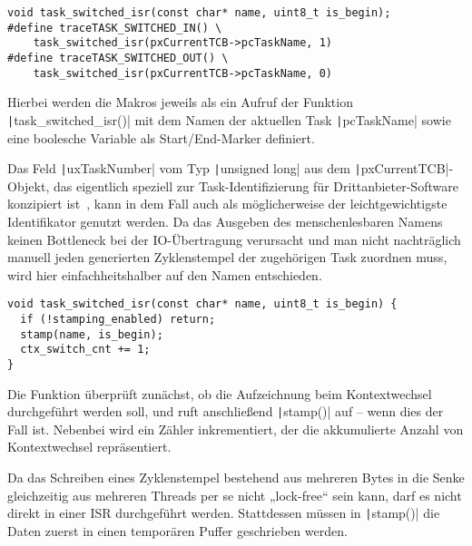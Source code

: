 \begin{code}
\begin{verbatim}
void task_switched_isr(const char* name, uint8_t is_begin);
#define traceTASK_SWITCHED_IN() \
    task_switched_isr(pxCurrentTCB->pcTaskName, 1)
#define traceTASK_SWITCHED_OUT() \
    task_switched_isr(pxCurrentTCB->pcTaskName, 0)
\end{verbatim}
\end{code}

Hierbei werden die Makros jeweils als ein Aufruf der Funktion
\texttt|task_switched_isr()| mit dem Namen der aktuellen Task
\texttt|pcTaskName| sowie eine boolesche Variable als Start/End-Marker
definiert.

Das Feld \texttt|uxTaskNumber| vom Typ \texttt|unsigned long|
aus dem \texttt|pxCurrentTCB|-Objekt, das eigentlich speziell zur
Task-Identifizierung für Drittanbieter-Software konzipiert
ist~\cite{freertos_task_c_410}, kann in dem Fall auch als möglicherweise der
leichtgewichtigste Identifikator genutzt werden. Da das Ausgeben des
menschenlesbaren Namens keinen Bottleneck bei der IO-Übertragung verursacht und
man nicht nachträglich manuell jeden generierten Zyklenstempel der zugehörigen
Task zuordnen muss, wird hier einfachheitshalber auf den Namen entschieden.

\begin{code}
\begin{verbatim}
void task_switched_isr(const char* name, uint8_t is_begin) {
  if (!stamping_enabled) return;
  stamp(name, is_begin);
  ctx_switch_cnt += 1;
}
\end{verbatim}
\end{code}

Die Funktion überprüft zunächst, ob die Aufzeichnung beim Kontextwechsel
durchgeführt werden soll, und ruft anschließend \texttt|stamp()| auf --
wenn dies der Fall ist. Nebenbei wird ein Zähler inkrementiert, der die
akkumulierte Anzahl von Kontextwechsel repräsentiert.

Da das Schreiben eines Zyklenstempel bestehend aus mehreren Bytes in die Senke
gleichzeitig aus mehreren Threads per se nicht „lock-free“ sein kann, darf es
nicht direkt in einer ISR durchgeführt werden. Stattdessen müssen in
\texttt|stamp()| die Daten zuerst in einen temporären Puffer
geschrieben werden.


